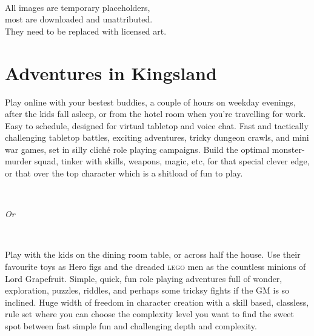 \

\noindent
All images are temporary placeholders, \\
most are downloaded and unattributed.\\
They need to be replaced with licensed art.

\normalsize






\cleardoublepage
\pagestyle{fancy}
\raggedbottom






\section*{Adventures in Kingsland}

\noindent
Play online with your bestest buddies, a couple of hours on weekday evenings, after the kids fall asleep, or from the hotel room when you're travelling for work. Easy to schedule, designed for virtual tabletop and voice chat.
Fast and tactically challenging tabletop battles, exciting adventures, tricky dungeon crawls, and mini war games, set in silly cliché role playing campaigns.
Build the optimal monster-murder squad, tinker with skills, weapons, magic, etc, for that special clever edge, or that over the top character which is a shitload of fun to play.

\

\emph{Or}

\

\noindent
Play with the kids on the dining room table, or across half the house. Use their favourite toys as Hero figs and the dreaded \textsc{lego} men as the countless minions of Lord Grapefruit.
Simple, quick, fun role playing adventures full of wonder, exploration, puzzles, riddles, and perhaps some tricksy fights if the GM is so inclined.
Huge width of freedom in character creation with a skill based, classless, rule set where you can choose the complexity level you want to find the sweet spot between fast simple fun and challenging depth and complexity.


